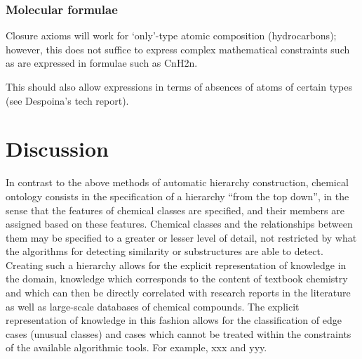 \documentclass[10pt]{bmc_article}
\newenvironment{bmcformat}{\baselineskip20pt\sloppy\setboolean{publ}{false}}{\baselineskip20pt\sloppy}
\begin{document}
\begin{bmcformat}
\subsubsection*{Molecular formulae}

Closure axioms will work for `only'-type atomic composition (hydrocarbons); however, this does not suffice to express complex mathematical constraints such as are expressed in formulae such as CnH2n. 

This should also allow expressions in terms of absences of atoms of certain types (see Despoina's tech report). 



\section*{Discussion}



In contrast to the above methods of automatic hierarchy construction, chemical ontology consists in the specification of a hierarchy ``from the top down'', in the sense that the features of chemical classes are specified, and their members are assigned based on these features.  Chemical classes and the relationships between them may be specified to a greater or lesser level of detail, not restricted by what the algorithms for detecting similarity or substructures are able to detect. Creating such a hierarchy allows for the explicit representation of knowledge in the domain, knowledge which corresponds to the content of textbook chemistry and which can then be directly correlated with research reports in the literature as well as large-scale databases of chemical compounds. %
The explicit representation of knowledge in this fashion allows for the classification of edge cases (unusual classes) and cases which cannot be treated within the constraints of the available algorithmic tools. For example, xxx and yyy. 





\end{bmcformat}
\end{document}
